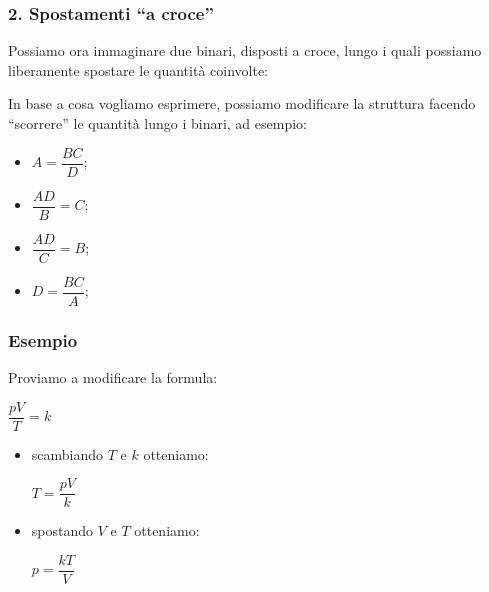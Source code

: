 \documentclass[]{beamer}
\begin{document}
\begin{frame}
\frametitle{2. Spostamenti ``a croce''}
Possiamo ora immaginare due binari, disposti a croce, lungo i quali possiamo liberamente spostare le quantità coinvolte:
\begin{figure}\centering
{}
\end{figure}\pause
In base a cosa vogliamo esprimere, possiamo modificare la struttura facendo ``scorrere'' le quantità lungo i binari, ad esempio:
  \begin{multicols}{2}
    \begin{itemize}
        \item $ A = \dfrac{B C}{D} $;\pause
        \item $ \dfrac{AD}{B} = C $;\pause
        \item $ \dfrac{AD}{C} = B $;\pause
        \item $ D = \dfrac{BC}{A} $;
    \end{itemize}
  \end{multicols}
\end{frame}

\begin{frame}
\frametitle{Esempio}
\begin{figure}\centering
{}
\end{figure}

Proviamo a modificare la formula:
\begin{center}
\alert{$ \dfrac{pV}{T} = k $}
\end{center}\pause
\begin{itemize}
  \item scambiando $ T $ e $ k $ otteniamo:\pause
  \begin{center}
  \alert<3>{$ T = \dfrac{pV}{k} $}
  \end{center}\pause
  \item spostando $ V $ e $ T $ otteniamo: \pause\begin{center}
  \alert<5>{$ p = \dfrac{kT}{V} $}
  \end{center}
\end{itemize}
\end{frame}
\end{document}
